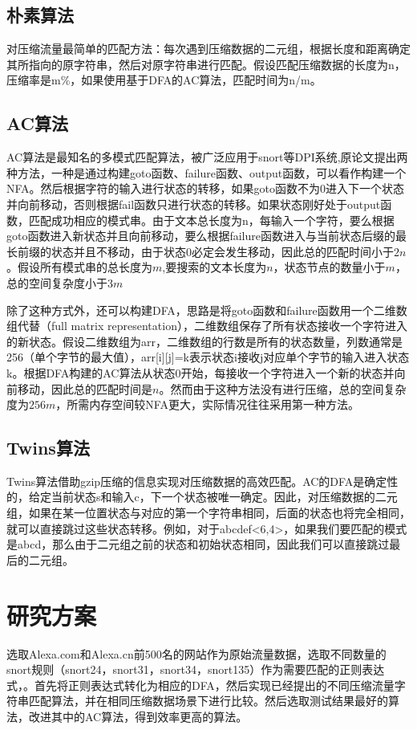 \subsection{朴素算法}
对压缩流量最简单的匹配方法：每次遇到压缩数据的二元组，根据长度和距离确定其所指向的原字符串，然后对原字符串进行匹配。假设匹配压缩数据的长度为n，压缩率是m\%，如果使用基于DFA的AC算法，匹配时间为n/m。

\subsection{AC算法}
AC算法是最知名的多模式匹配算法，被广泛应用于snort等DPI系统,原论文\cite{aho1975efficient}提出两种方法，一种是通过构建goto函数、failure函数、output函数，可以看作构建一个NFA。然后根据字符的输入进行状态的转移，如果goto函数不为0进入下一个状态并向前移动，否则根据fail函数只进行状态的转移。如果状态刚好处于output函数，匹配成功相应的模式串。由于文本总长度为n，每输入一个字符，要么根据goto函数进入新状态并且向前移动，要么根据failure函数进入与当前状态后缀的最长前缀的状态并且不移动，由于状态0必定会发生移动，因此总的匹配时间小于$2n$。假设所有模式串的总长度为$m$,要搜索的文本长度为$n$，状态节点的数量小于$m$，总的空间复杂度小于$3m$

除了这种方式外，还可以构建DFA，思路是将goto函数和failure函数用一个二维数组代替（full matrix representation），二维数组保存了所有状态接收一个字符进入的新状态。假设二维数组为arr，二维数组的行数是所有的状态数量，列数通常是256（单个字节的最大值），arr[i][j]=k表示状态i接收j对应单个字节的输入进入状态k。根据DFA构建的AC算法从状态0开始，每接收一个字符进入一个新的状态并向前移动，因此总的匹配时间是$n$。然而由于这种方法没有进行压缩，总的空间复杂度为$256m$，所需内存空间较NFA更大，实际情况往往采用第一种方法。



\subsection{Twins算法}
Twins算法借助gzip压缩的信息实现对压缩数据的高效匹配。AC的DFA是确定性的，给定当前状态s和输入c，下一个状态被唯一确定。因此，对压缩数据的二元组，如果在某一位置状态与对应的第一个字符串相同，后面的状态也将完全相同，就可以直接跳过这些状态转移。例如，对于abcdef<6,4>，如果我们要匹配的模式是abcd，那么由于二元组之前的状态和初始状态相同，因此我们可以直接跳过最后的二元组。


\section{研究方案}
选取Alexa.com和Alexa.cn前500名的网站作为原始流量数据，选取不同数量的snort规则（snort24，snort31，snort34，snort135）作为需要匹配的正则表达式，。首先将正则表达式转化为相应的DFA，然后实现已经提出的不同压缩流量字符串匹配算法，并在相同压缩数据场景下进行比较。然后选取测试结果最好的算法，改进其中的AC算法，得到效率更高的算法。

